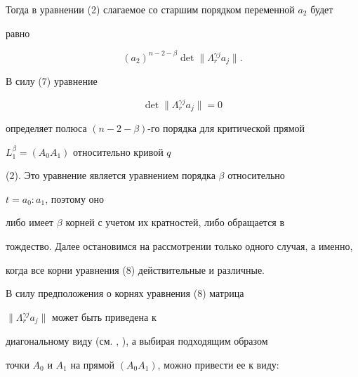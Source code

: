 %


Тогда в уравнении (2) слагаемое со старшим порядком переменной $a_2$ будет 


равно 


%


\begin{equation} 


(a_2)^{n-2-\beta}\det\|\Lambda{}_r^{\gamma j}a_j\|. 


\end{equation} 


%


В силу (7) уравнение 


%


\begin{equation} 


\det\|\Lambda{}_r^{\gamma j}a_j\|=0 


\end{equation} 


%


определяет полюса $(n-2-\beta)$-го порядка для критической прямой 


$L_1^\beta=(A_0A_1)$ относительно кривой $q$ 


(2). Это уравнение является уравнением порядка $\beta$ относительно 


$t=a_0{:}a_1$, поэтому оно 


либо имеет $\beta$ корней с учетом их кратностей, либо обращается в 


тождество. Далее остановимся на рассмотрении только одного случая, а именно, 


когда все корни уравнения (8) действительные и различные. 


 


В силу предположения о корнях уравнения (8) матрица 


$\|\Lambda{}_r^{\gamma j}a_j\|$ может быть приведена к 


диагональному виду (см. \cite{Gan}, \cite{La2}), а выбирая подходящим образом 


точки $A_0$ и $A_1$ на прямой $(A_0A_1)$, можно привести ее к виду: 


%


